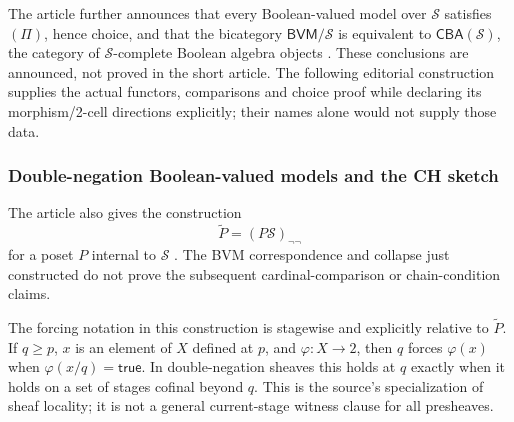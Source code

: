 The article further announces that every Boolean-valued model over
\(\mathcal S\) satisfies \((\Pi)\), hence choice, and that
the bicategory \(\mathsf{BVM}/\mathcal S\) is equivalent to
\(\mathsf{CBA}(\mathcal S)\), the category of
\(\mathcal S\)-complete Boolean algebra objects
\cite[p.~333]{Lawvere1970}. These conclusions are announced, not
proved in the short article. The following editorial construction
supplies the actual functors, comparisons and choice proof while
declaring its morphism/2-cell directions explicitly; their names
alone would not supply those data.




\subsubsection{Double-negation Boolean-valued models and the CH sketch}

The article also gives the construction
\[
           \widetilde P=(P\mathcal S)_{\neg\neg}
\]
for a poset \(P\) internal to \(\mathcal S\)
\cite[p.~333]{Lawvere1970}. The BVM correspondence and collapse
just constructed do not prove the subsequent cardinal-comparison
or chain-condition claims.

The forcing notation in this construction is stagewise and explicitly
relative to \(\widetilde P\).  If \(q\geq p\), \(x\) is
an element of \(X\) defined at \(p\), and
\(\varphi:X\to2\), then \(q\) forces \(\varphi(x)\)
when \(\varphi(x/q)=\mathsf{true}\).  In double-negation
sheaves this holds at \(q\) exactly when it holds on a set of
stages cofinal beyond \(q\).  This is the source's specialization
of sheaf locality; it is not a general current-stage witness clause
for all presheaves.

